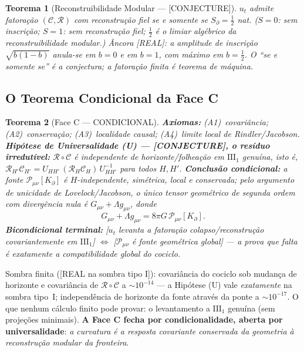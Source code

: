 \documentclass[11pt,a4paper]{article}
\newcommand{\REAL}{\textsf{[REAL]}}
\newcommand{\SOMBRA}{\textsf{[REAL na sombra tipo I]}}
\newcommand{\CONJ}{\textsf{[CONJECTURE]}}
\newtheorem{theorem}{Teorema}
\begin{document}
\begin{theorem}[Reconstruibilidade Modular --- \CONJ]\label{thm:reconstr}
$u_t$ admite fatoração $(\mathcal C,\mathcal R)$ com reconstrução fiel
\emph{se e somente se} $S_\partial=\tfrac12$ nat. ($S=0$: sem inscrição;
$S=1$: sem reconstrução fiel; $\tfrac12$ é o \emph{limiar algébrico da
reconstruibilidade modular}.) Âncora \REAL: a amplitude de inscrição
$\sqrt{b(1-b)}$ anula-se em $b=0$ e em $b=1$, com máximo em $b=\tfrac12$. O
``se e somente se'' é a conjectura; a fatoração finita é teorema de máquina.
\end{theorem}

\subsection{O Teorema Condicional da Face C}
\begin{theorem}[Face C --- CONDICIONAL]\label{thm:faceC}
\textbf{Axiomas:} (A1)~covariância; (A2)~conservação; (A3)~localidade
causal; (A4)~limite local de Rindler/Jacobson.
\textbf{Hipótese de Universalidade (U) --- \CONJ, o resíduo irredutível:}
$\mathcal R\circ\mathcal C$ é independente de horizonte/folheação em
$\mathrm{III}_1$ genuína, isto é,
$\mathcal R_{H'}\mathcal C_{H'}
=U_{HH'}\,(\mathcal R_H\mathcal C_H)\,U_{HH'}^{-1}$ para todos $H,H'$.
\textbf{Conclusão condicional:} a fonte $\mathcal P_{\mu\nu}[K_\partial]$ é
$H$-independente, simétrica, local e conservada; pelo argumento de unicidade
de Lovelock/Jacobson, o único tensor geométrico de segunda ordem com
divergência nula é $G_{\mu\nu}+\Lambda g_{\mu\nu}$, donde
\begin{equation}
\boxed{\;G_{\mu\nu}+\Lambda g_{\mu\nu}
=8\pi G\,\mathcal P_{\mu\nu}[K_\partial].\;}
\end{equation}
\textbf{Bicondicional terminal:} [$u_t$ levanta a fatoração
colapso/reconstrução covariantemente em $\mathrm{III}_1$]
$\Longleftrightarrow$ [$\mathcal P_{\mu\nu}$ é fonte geométrica global] ---
\emph{a prova que falta é exatamente a compatibilidade global do cociclo}.
\end{theorem}

\noindent Sombra finita (\SOMBRA): covariância do cociclo sob mudança de
horizonte e covariância de $\mathcal R\circ\mathcal C$ a $\sim10^{-14}$ ---
a Hipótese (U) vale \emph{exatamente} na sombra tipo~I; independência de
horizonte da fonte através da ponte a $\sim10^{-17}$. O que nenhum cálculo
finito pode provar: o levantamento a $\mathrm{III}_1$ genuína (sem projeções
minimais). \textbf{A Face C fecha por condicionalidade, aberta por
universalidade}: \emph{a curvatura é a resposta covariante conservada da
geometria à reconstrução modular da fronteira}.
\end{document}
